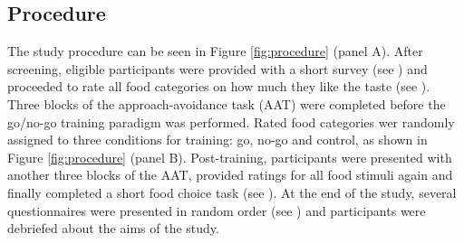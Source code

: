 \documentclass[man,floatsintext]{apa6}
\begin{document}
\subsection{Procedure}\label{procedure}

The study procedure can be seen in Figure \ref{fig:procedure} (panel A).
After screening, eligible participants were provided with a short survey
(see \textit{}) and proceeded to rate all
food categories on how much they like the taste (see
\textit{}). Three blocks of the approach-avoidance
task (AAT) were completed before the go/no-go training paradigm was
performed. Rated food categories wer randomly assigned to three
conditions for training: go, no-go and control, as shown in Figure
\ref{fig:procedure} (panel B). Post-training, participants were
presented with another three blocks of the AAT, provided ratings for all
food stimuli again and finally completed a short food choice task (see
\textit{}). At the end of the study, several
questionnaires were presented in random order (see
\textit{}) and participants were
debriefed about the aims of the study.
\end{document}

